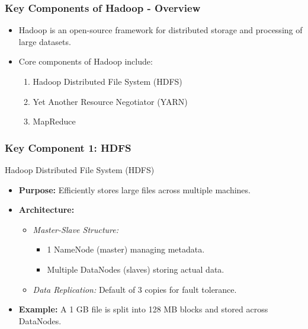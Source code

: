 \documentclass[aspectratio=169]{beamer}
\begin{document}
\begin{frame}[fragile]
  \frametitle{Key Components of Hadoop - Overview}
  \begin{itemize}
      \item Hadoop is an open-source framework for distributed storage and processing of large datasets.
      \item Core components of Hadoop include:
      \begin{enumerate}
          \item Hadoop Distributed File System (HDFS)
          \item Yet Another Resource Negotiator (YARN)
          \item MapReduce
      \end{enumerate}
  \end{itemize}
\end{frame}

\begin{frame}[fragile]
  \frametitle{Key Component 1: HDFS}
  \begin{block}{Hadoop Distributed File System (HDFS)}
      \begin{itemize}
          \item \textbf{Purpose:} Efficiently stores large files across multiple machines.
          \item \textbf{Architecture:}
          \begin{itemize}
              \item \textit{Master-Slave Structure:} 
              \begin{itemize}
                  \item 1 NameNode (master) managing metadata.
                  \item Multiple DataNodes (slaves) storing actual data.
              \end{itemize}
              \item \textit{Data Replication:} Default of 3 copies for fault tolerance.
          \end{itemize}
          \item \textbf{Example:} A 1 GB file is split into 128 MB blocks and stored across DataNodes.
      \end{itemize}
  \end{block}
\end{frame}
\end{document}
